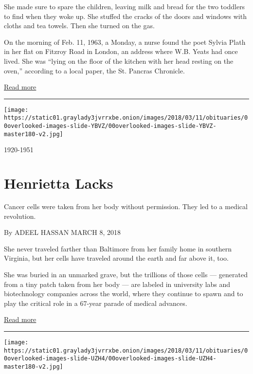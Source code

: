 She made sure to spare the children, leaving milk and bread for the two
toddlers to find when they woke up. She stuffed the cracks of the doors
and windows with cloths and tea towels. Then she turned on the gas.

On the morning of Feb. 11, 1963, a Monday, a nurse found the poet Sylvia
Plath in her flat on Fitzroy Road in London, an address where W.B. Yeats
had once lived. She was ``lying on the floor of the kitchen with her
head resting on the oven,'' according to a local paper, the St. Pancras
Chronicle.

\href{https://www.nytimes3xbfgragh.onion/interactive/2018/obituaries/overlooked-sylvia-plath.html}{Read
more}

\begin{center}\rule{0.5\linewidth}{\linethickness}\end{center}

\texttt{[image: https://static01.graylady3jvrrxbe.onion/images/2018/03/11/obituaries/00overlooked-images-slide-YBVZ/00overlooked-images-slide-YBVZ-master180-v2.jpg]}

1920-1951

\hypertarget{henrietta-lacks}{%
\section{Henrietta Lacks}\label{henrietta-lacks}}

Cancer cells were taken from her body without permission. They led to a
medical revolution.

By ADEEL HASSAN MARCH 8, 2018

She never traveled farther than Baltimore from her family home in
southern Virginia, but her cells have traveled around the earth and far
above it, too.

She was buried in an unmarked grave, but the trillions of those cells
--- generated from a tiny patch taken from her body --- are labeled in
university labs and biotechnology companies across the world, where they
continue to spawn and to play the critical role in a 67-year parade of
medical advances.

\href{https://www.nytimes3xbfgragh.onion/interactive/2018/obituaries/overlooked-henrietta-lacks.html}{Read
more}

\begin{center}\rule{0.5\linewidth}{\linethickness}\end{center}

\texttt{[image: https://static01.graylady3jvrrxbe.onion/images/2018/03/11/obituaries/00overlooked-images-slide-UZH4/00overlooked-images-slide-UZH4-master180-v2.jpg]}

